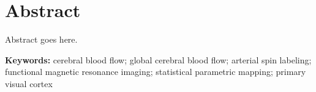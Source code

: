 \section{Abstract}
Abstract goes here.

\textbf{Keywords:} cerebral blood flow; global cerebral blood flow; arterial spin labeling; functional magnetic resonance imaging; statistical parametric mapping; primary visual cortex

